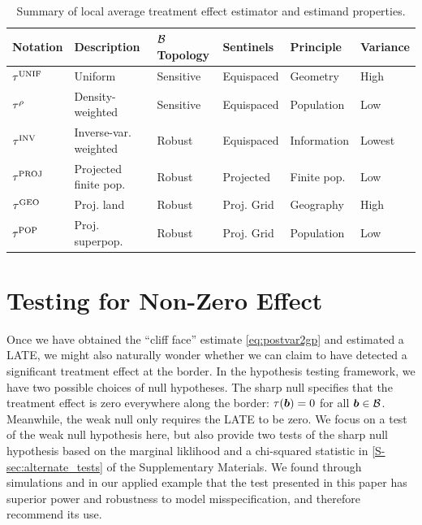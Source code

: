 \documentclass[12pt]{article}
\begin{document}
\begin{table}[tbp]
    \centering
    \bgroup
    \def\arraystretch{1.1}%
    \begin{tabular}{llllll}
        \hline
        Notation   & Description           & \(\mathcal{B}\) Topology & Sentinels & Principle & Variance \\
        \hline
        \(\tau^{\mathrm{UNIF}}\) & Uniform               & Sensitive & Equispaced      & Geometry    & High     \\
        \(\tau^{\rho}\)  & Density-weighted      & Sensitive & Equispaced      & Population  & Low      \\
        \(\tau^{\mathrm{INV}}\)  & Inverse-var. weighted & Robust    & Equispaced      & Information & Lowest   \\
        \(\tau^{\mathrm{PROJ}}\) & Projected finite pop. & Robust    & Projected       & Finite pop. & Low      \\
        \(\tau^{\mathrm{GEO}}\)  & Proj. land            & Robust    & Proj. Grid  & Geography   & High     \\
        \(\tau^{\mathrm{POP}}\)  & Proj. superpop.       & Robust    & Proj. Grid  & Population  & Low \\
        \hline
    \end{tabular}
    \egroup
    \caption{
    \label{table:estimator_properties}
    Summary of local average treatment effect estimator and estimand properties.}
\end{table}

\section{Testing for Non-Zero Effect}
\label{sec:hypothesis_testing}
Once we have obtained the ``cliff face'' estimate \autoref{eq:postvar2gp} and estimated a LATE, we might also naturally wonder whether we can claim to have detected a significant treatment effect at the border.
In the hypothesis testing framework, we have two possible choices of null hypotheses.
The sharp null specifies that the treatment effect is zero everywhere along the border:
\(\tau(\bm{b})=0\) for all \(\bm{b} \in \mathcal{B}\).
Meanwhile, the weak null only requires the LATE to be zero.
We focus on a test of the weak null hypothesis here, but also provide two tests of the sharp null hypothesis based on the marginal liklihood and a chi-squared statistic in \autoref*{S-sec:alternate_tests} of the Supplementary Materials.
We found through simulations and in our applied example that the test presented in this paper has superior power and robustness to model misspecification, and therefore recommend its use.
\end{document}
